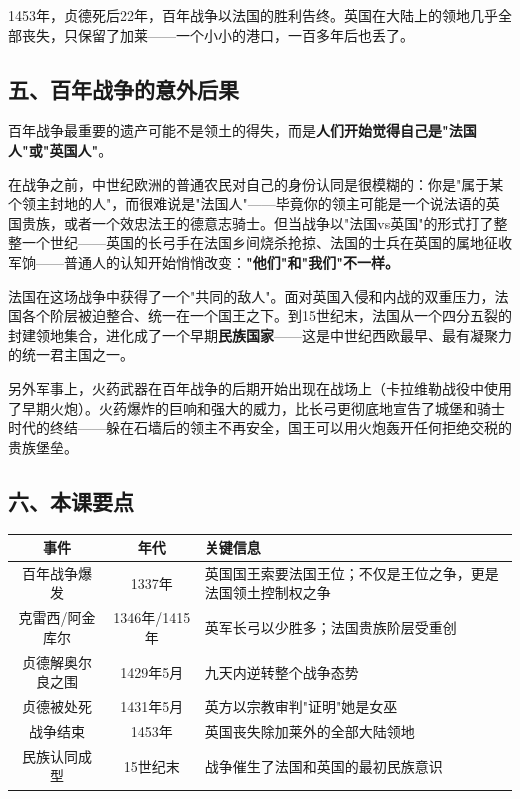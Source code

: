 \documentclass[a4paper,12pt]{ctexart}
\begin{document}
1453年，贞德死后22年，百年战争以法国的胜利告终。英国在大陆上的领地几乎全部丧失，只保留了加莱——一个小小的港口，一百多年后也丢了。

\subsection*{五、百年战争的意外后果}

百年战争最重要的遗产可能不是领土的得失，而是\textbf{人们开始觉得自己是"法国人"或"英国人"}。

在战争之前，中世纪欧洲的普通农民对自己的身份认同是很模糊的：你是"属于某个领主封地的人"，而很难说是"法国人"——毕竟你的领主可能是一个说法语的英国贵族，或者一个效忠法王的德意志骑士。但当战争以"法国vs英国"的形式打了整整一个世纪——英国的长弓手在法国乡间烧杀抢掠、法国的士兵在英国的属地征收军饷——普通人的认知开始悄悄改变：\textbf{"他们"和"我们"不一样。}

法国在这场战争中获得了一个"共同的敌人"。面对英国入侵和内战的双重压力，法国各个阶层被迫整合、统一在一个国王之下。到15世纪末，法国从一个四分五裂的封建领地集合，进化成了一个早期\textbf{民族国家}——这是中世纪西欧最早、最有凝聚力的统一君主国之一。

另外军事上，火药武器在百年战争的后期开始出现在战场上（卡拉维勒战役中使用了早期火炮）。火药爆炸的巨响和强大的威力，比长弓更彻底地宣告了城堡和骑士时代的终结——躲在石墙后的领主不再安全，国王可以用火炮轰开任何拒绝交税的贵族堡垒。

\subsection*{六、本课要点}

\begin{center}
\begin{tabular}{|c|c|p{7cm}|}
\hline
\textbf{事件} & \textbf{年代} & \textbf{关键信息} \\
\hline
百年战争爆发 & 1337年 & 英国国王索要法国王位；不仅是王位之争，更是法国领土控制权之争 \\
\hline
克雷西/阿金库尔 & 1346年/1415年 & 英军长弓以少胜多；法国贵族阶层受重创 \\
\hline
贞德解奥尔良之围 & 1429年5月 & 九天内逆转整个战争态势 \\
\hline
贞德被处死 & 1431年5月 & 英方以宗教审判"证明"她是女巫 \\
\hline
战争结束 & 1453年 & 英国丧失除加莱外的全部大陆领地 \\
\hline
民族认同成型 & 15世纪末 & 战争催生了法国和英国的最初民族意识 \\
\hline
\end{tabular}
\end{center}
\end{document}
